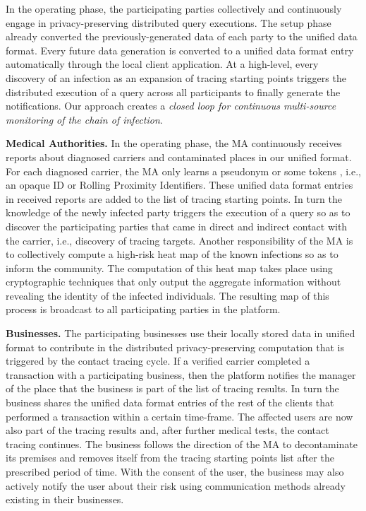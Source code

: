 \documentclass[11pt]{article}  %
\begin{document}
In the operating phase, the participating parties collectively and continuously engage in privacy-preserving distributed query executions. 
The setup phase already converted the previously-generated data of each party to the unified data format. 
Every future data generation is converted to a unified data format entry automatically through the local client application. 
At a high-level, every discovery of an infection as an expansion of tracing starting points triggers the distributed execution of a query across all participants to finally generate the notifications.
Our approach creates a \emph{closed loop for continuous multi-source monitoring of the chain of infection}.



\textbf{Medical Authorities. }In the operating phase, the MA continuously receives reports about diagnosed carriers and contaminated places in our unified format.
For each diagnosed carrier, the MA only learns a pseudonym or some tokens , i.e., an opaque ID or  Rolling Proximity Identifiers.
  These unified data format entries in received reports are added to the list of tracing starting points. 
In turn the knowledge of the newly infected party triggers the execution of a query so as to discover the participating parties that came in direct and indirect contact with the carrier, i.e., discovery of tracing targets. 
Another responsibility of the MA is to collectively compute a high-risk heat map of the known infections so as to inform the community. 
The computation of this heat map takes place using cryptographic techniques that only output the aggregate information without revealing the identity of the infected individuals. 
The resulting map of this process is broadcast to all participating parties in the platform.

\textbf{Businesses. }The participating businesses use their locally stored data in unified format to contribute in the distributed privacy-preserving computation that is triggered by the contact tracing cycle. 
If a verified carrier completed a transaction with a participating business, then the platform notifies the manager of the place that the business is part of the list of tracing results. 
In turn the business shares the unified data format entries of the rest of the clients that performed a transaction within a certain time-frame. The affected users are now also part of the tracing results and, after further medical tests, the contact tracing continues. 
The business follows the direction of the MA to decontaminate its premises and removes itself from the tracing starting points list after the prescribed period of time.
 With the consent of the user, the business may also actively notify the user about their risk using communication methods already existing in their businesses.
\end{document}
